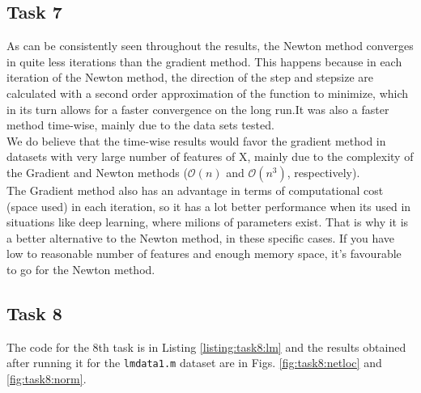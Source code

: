 \subsection{Task 7}
As can be consistently seen throughout the results, the Newton method converges in quite less iterations than the gradient method. This happens because in each iteration of the Newton method, the direction of the step and stepsize are calculated with a second order approximation of the function to minimize, which in its turn allows for a faster convergence on the long run.It was also a faster method time-wise, mainly due to the data sets tested. \\ We do believe that the time-wise results would favor the gradient method in datasets with very large number of features of X, mainly due to the complexity of the Gradient and Newton methods ($\mathcal{O}(n)$ and $\mathcal{O}(n^{3})$, respectively).\\
The Gradient method also has an advantage in terms of computational cost (space used) in each iteration, so it has a lot better performance when its used in situations like deep learning, where milions of parameters exist. That is why it is a better alternative to the Newton method, in these specific cases. If you have low to reasonable number of features and enough memory space, it's favourable to go for the Newton method.
\subsection{Task 8}

The code for the 8th task is in Listing \ref{listing:task8:lm} and the results obtained after running it for the \texttt{lmdata1.m} dataset are in Figs. \ref{fig:task8:netloc} and \ref{fig:task8:norm}.

